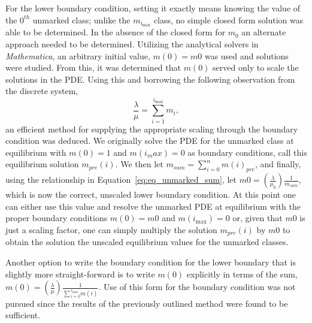 \documentclass[review]{elsarticle}
\newcommand{\imax}{\ensuremath{i_{\max}}\xspace}
\begin{document}
For the lower boundary condition, setting it exactly means knowing the value of the $0^{th}$ unmarked class; unlike the $m_{\imax}$ class, no simple closed form solution was able to be determined.
In the absence of the closed form for $m_0$ an alternate approach needed to be determined.
Utilizing the analytical solvers in \emph{Mathematica}, an arbitrary initial value, $m(0)=m0$ was used and solutions were studied.
From this, it was determined that $m(0)$ served only to scale the solutions in the PDE.
Using this and borrowing the following observation from the discrete system,
\begin{equation}\label{eq:eq_unmarked_sum}
\frac{\lambda}{\mu}=\sum_{i=1}^{\imax}m_{i},
\end{equation}
an efficient method for supplying the appropriate scaling through the boundary condition was deduced.
We originally solve the PDE for the unmarked class at equilibrium with $m(0)=1$ and $m(i_max)=0$ as boundary conditions, call this equilibrium solution $m_{pre}(i)$.
We then let $m_{sum}=\sum_{i=0}^{n}m(i)_{pre}$, and finally, using the relationship in Equation~\ref{eq:eq_unmarked_sum}, let $m0=\left(\frac{\lambda}{\mu_0}\right)\frac{1}{m_{sum}}$, which is now the correct, unscaled lower boundary condition.
At this point one can either use this value and resolve the unmarked PDE at equilibrium with the proper boundary conditions $m(0)=m0$ and $m(\imax)=0$ or, given that $m0$ is just a scaling factor, one can simply multiply the solution $m_{pre}(i)$ by $m0$ to obtain the solution the unscaled equilibrium values for the unmarked classes.

Another option to write the boundary condition for the lower boundary that is slightly more straight-forward is to write $m(0)$ explicitly in terms of the sum, $m(0)=\left(\frac{\lambda}{\mu}\right)\frac{1}{\sum{}_{i=0}^{\imax}m(i)}$.
Use of this form for the boundary condition was not pursued since the results of the previously outlined method were found to be sufficient.

\end{document}
